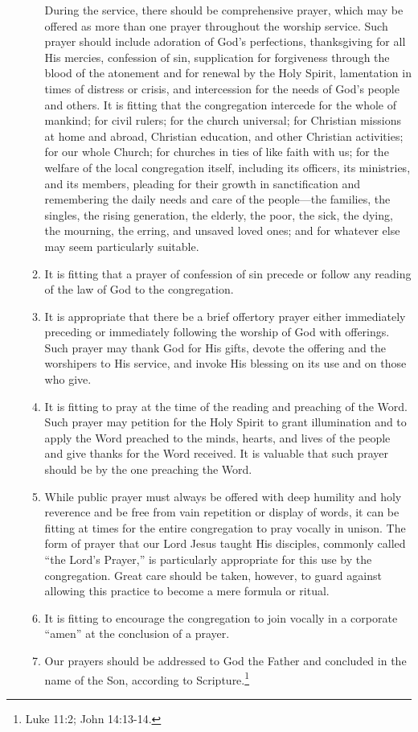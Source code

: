 \documentclass[
]{book}
\begin{document}
\begin{enumerate}
\begin{enumerate}
    During the service, there should be comprehensive prayer, which may be offered as more than one prayer throughout the worship service. Such prayer should include adoration of God's perfections, thanksgiving for all His mercies, confession of sin, supplication for forgiveness through the blood of the atonement and for renewal by the Holy Spirit, lamentation in times of distress or crisis, and intercession for the needs of God's people and others. It is fitting that the congregation intercede for the whole of mankind; for civil rulers; for the church universal; for Christian missions at home and abroad, Christian education, and other Christian activities; for our whole Church; for churches in ties of like faith with us; for the welfare of the local congregation itself, including its officers, its ministries, and its members, pleading for their growth in sanctification and remembering the daily needs and care of the people---the families, the singles, the rising generation, the elderly, the poor, the sick, the dying, the mourning, the erring, and unsaved loved ones; and for whatever else may seem particularly suitable.
  \item
    It is fitting that a prayer of confession of sin precede or follow any reading of the law of God to the congregation.
  \item
    It is appropriate that there be a brief offertory prayer either immediately preceding or immediately following the worship of God with offerings. Such prayer may thank God for His gifts, devote the offering and the worshipers to His service, and invoke His blessing on its use and on those who give.
  \item
    It is fitting to pray at the time of the reading and preaching of the Word. Such prayer may petition for the Holy Spirit to grant illumination and to apply the Word preached to the minds, hearts, and lives of the people and give thanks for the Word received. It is valuable that such prayer should be by the one preaching the Word.
  \item
    While public prayer must always be offered with deep humility and holy reverence and be free from vain repetition or display of words, it can be fitting at times for the entire congregation to pray vocally in unison. The form of prayer that our Lord Jesus taught His disciples, commonly called ``the Lord's Prayer,'' is particularly appropriate for this use by the congregation. Great care should be taken, however, to guard against allowing this practice to become a mere formula or ritual.
  \item
    It is fitting to encourage the congregation to join vocally in a corporate ``amen'' at the conclusion of a prayer.
  \item
    Our prayers should be addressed to God the Father and concluded in the name of the Son, according to Scripture.\footnote{Luke 11:2; John 14:13-14.}
  \end{enumerate}
\end{enumerate}
\end{document}
